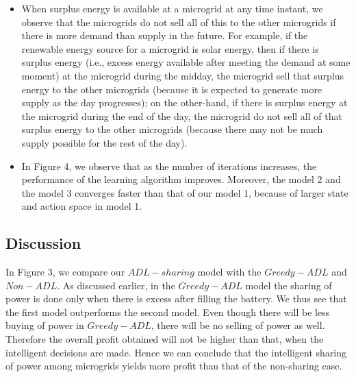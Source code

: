 \begin{itemize}
\item When surplus energy is available at a microgrid at any time instant, we observe that the microgrids do not sell all of this to the other microgrids if there is more demand than supply in the future. For example, if the renewable energy source for a microgrid is solar energy, then if there is surplus energy (i.e., excess energy available after meeting the demand at some moment) at the microgrid during the midday, the microgrid sell that surplus energy to the other microgrids (because it is expected to generate more supply as the day progresses); on the other-hand, if there is surplus energy at the microgrid during the end of the day, the microgrid do not sell all of that surplus energy to the other microgrids (because there may not be much supply possible for the rest of the day).

\item In Figure 4, we observe that as the number of iterations increases, the performance of the learning algorithm improves. Moreover, the model 2 and the model 3 converges faster than that of our model 1, because of larger state and action space in model 1. 


\end{itemize}

\subsection{Discussion}

In Figure 3, we compare our $ADL-sharing$ model with the $Greedy- ADL$ and $Non-ADL$. As discussed earlier, in the $Greedy-ADL$ model the sharing of power is done only when there is excess after filling the battery. We thus see that the first model outperforms the second model. Even though there will be less buying of power in $Greedy-ADL$, there will be no selling of power as well. Therefore the overall profit obtained will not be higher than that, when the intelligent decisions are made. Hence we can conclude that the intelligent sharing of power among microgrids yields more profit than that of the non-sharing case. 

